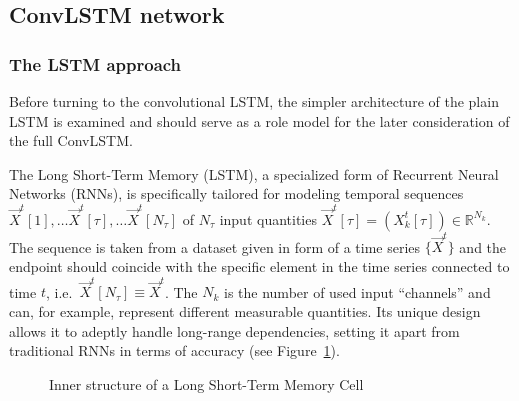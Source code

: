 \documentclass[
]{agujournal2019}
\begin{document}
\subsection{ConvLSTM network}\label{convlstm-network}

\subsubsection{The LSTM approach}\label{sec-LSTM}

Before turning to the convolutional LSTM, the simpler architecture of
the plain LSTM is examined and should serve as a role model for the
later consideration of the full ConvLSTM.

The Long Short-Term Memory (LSTM), a specialized form of Recurrent
Neural Networks (RNNs), is specifically tailored for modeling temporal
sequences
\(\vec{X}^t[1], \ldots \vec{X}^t[\tau],\ldots \vec{X}^t[N_\tau]\) of
\(N_\tau\) input quantities
\(\vec{X}^t[\tau] = (X^t_k[\tau]) \in \mathbb{R}^{N_k}\). The sequence
is taken from a dataset given in form of a time series \(\{\vec{X}^t\}\)
and the endpoint should coincide with the specific element in the time
series connected to time \(t\),
i.e.~\(\vec{X}^t[N_\tau] \equiv \vec{X}^t\). The \(N_k\) is the number
of used input ``channels'' and can, for example, represent different
measurable quantities. Its unique design allows it to adeptly handle
long-range dependencies, setting it apart from traditional RNNs in terms
of accuracy (see Figure~\ref{fig-lstm}).

\begin{figure}


\caption{\label{fig-lstm}Inner structure of a Long Short-Term Memory
Cell}

\end{figure}%
\end{document}
